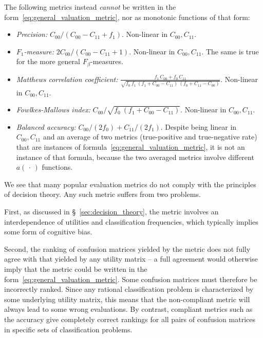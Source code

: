 \documentclass[\ifafour a4paper,12pt,\else a5paper,10pt,\fi%
onecolumn,oneside,article,%
british%
]{memoir}
\theoremstyle{remark}
\theoremstyle{innote}
\newcommand*{\dotv}{\mathord{\,\cdot\,}}%
\renewcommand*{\|}[1][]{\nonscript\:#1\vert\nonscript\:\mathopen{}}
\newcommand*{\sect}{\S}%
\newcommand*{\itemno}{{\fontencoding{U}\fontfamily{pzd}\selectfont\symbol{55}}}
\begin{document}
The following metrics instead \emph{cannot} be written in the form~\eqref{eq:general_valuation_metric}, nor as monotonic functions of that form:
\begin{itemize}
\item[\itemno] \emph{Precision:} $C_{00}/(C_{00}-C_{11}+f_{1})$. Non-linear in $C_{00}, C_{11}$.

\item[\itemno] \emph{$F_{1}$-measure:} $2 C_{00}/(C_{00} - C_{11} + 1)$. Non-linear in $C_{00}, C_{11}$. The same is true for the more general $F_{\beta}$-measures.

\item[\itemno] \emph{Matthews correlation coefficient:} $\frac{
    f_{1}\,C_{00} + f_{0}\,C_{11}}{\sqrt{
      f_{0}\ f_{1}\ (f_{1} + C_{00} - C_{11})\ (f_{0} + C_{11} - C_{00})
    }}$. Non-linear in $C_{00}, C_{11}$.

\item[\itemno] \emph{Fowlkes-Mallows index:} $C_{00}/\sqrt{
      f_{0}\ (f_{1} + C_{00} - C_{11})}$. Non-linear in $C_{00}, C_{11}$.

  \item[\itemno] \emph{Balanced accuracy:} $C_{00}/(2 f_{0}) + C_{11}/(2 f_{1})$. Despite being linear in $C_{00}, C_{11}$ and an average of two metrics (true-positive and true-negative rate) that are instances of formula~\eqref{eq:general_valuation_metric}, it is not an instance of that formula, because the two averaged metrics involve different $a(\dotv)$ functions.
\end{itemize}

We see that many popular evaluation metrics do not comply with the principles of decision theory. Any such metric suffers from two problems.

First, as discussed in \sect~\ref{sec:decision_theory}, the metric involves an interdependence of utilities and classification frequencies, which typically implies some form of cognitive bias\autocites[discuss such biases regarding the $F_{1}$-measure]{handetal2018}.

Second, the ranking of confusion matrices yielded by the metric does not fully agree with that yielded by any utility matrix -- a full agreement would otherwise imply that the metric could be written in the form~\eqref{eq:general_valuation_metric}. Some confusion matrices must therefore be incorrectly ranked. Since any rational classification problem is characterized by some underlying utility matrix, this means that the non-compliant metric will always lead to some wrong evaluations. By contrast, compliant metrics such as the accuracy give completely correct rankings for all pairs of confusion matrices in specific sets of classification problems.
\end{document}
